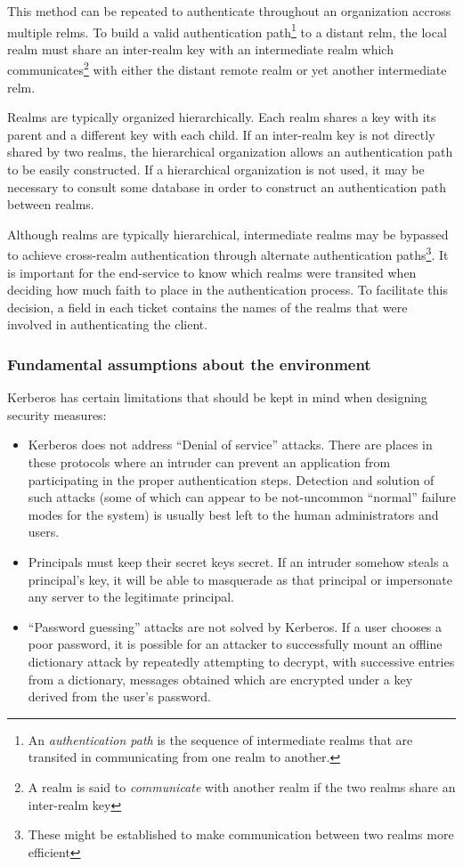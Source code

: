 This method can be repeated to authenticate throughout an organization
accross multiple relms.  To build a valid authentication
path\footnote{An {\em authentication path} is the sequence of
intermediate realms that are transited in communicating from one realm
to another.} to a distant relm, the local realm must share an
inter-realm key with an intermediate realm which
communicates\footnote{A realm is said to {\em communicate} with
another realm if the two realms share an inter-realm key} with either
the distant remote realm or yet another intermediate relm.

Realms are typically organized hierarchically.  Each realm shares a
key with its parent and a different key with each child.  If an
inter-realm key is not directly shared by two realms, the hierarchical
organization allows an authentication path to be easily constructed.
If a hierarchical organization is not used, it may be necessary to
consult some database in order to construct an authentication path
between realms.

Although realms are typically hierarchical, intermediate realms may be
bypassed to achieve cross-realm authentication through alternate
authentication paths\footnote{These might be established to make communication
between two realms more efficient}.  It is important for the
end-service to know which realms were transited when deciding how much
faith to place in the authentication process.  To facilitate this
decision, a field in each ticket contains the names of the realms that
were involved in authenticating the client.

\subsubsection{Fundamental assumptions about the environment}

Kerberos has certain limitations that should be kept in mind when
designing security measures:

\begin{itemize}
\item
Kerberos does not address ``Denial of service'' attacks.  There are
places in these protocols where an intruder can prevent an application
from participating in the proper authentication steps.  Detection and
solution of such attacks (some of which can appear to be not-uncommon
``normal'' failure modes for the system) is usually best left to
the human administrators and users.

\item
Principals must keep their secret keys secret.  If an intruder somehow
steals a principal's key, it will be able to masquerade as that
principal or impersonate any server to the legitimate principal.

\item
``Password guessing'' attacks are not solved by Kerberos.  If a user
chooses a poor password, it is possible for an attacker to
successfully mount an offline dictionary attack by repeatedly
attempting to decrypt, with successive entries from a dictionary,
messages obtained which are encrypted under a key derived from the
user's password.

\end{itemize}

